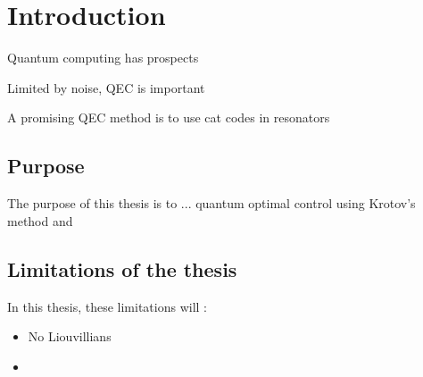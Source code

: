 \documentclass[main.tex]{subfiles}
\begin{document}
\chapter{Introduction}
Quantum computing has prospects

Limited by noise, QEC is important

A promising QEC method is to use cat codes in resonators


\section{Purpose}
The purpose of this thesis is to ... quantum optimal control using Krotov's method and


\section{Limitations of the thesis}
In this thesis, these limitations will :
\begin{itemize}
    \item No Liouvillians
    \item 
\end{itemize}
\end{document}
